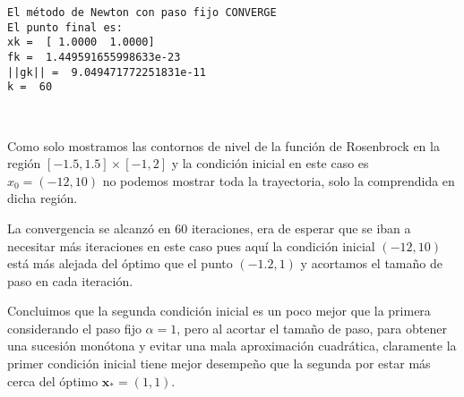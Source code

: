 \documentclass[11pt]{article}
\begin{document}
    \begin{Verbatim}[commandchars=\\\{\}]
El método de Newton con paso fijo CONVERGE
El punto final es:
xk =  [ 1.0000  1.0000]
fk =  1.449591655998633e-23
||gk|| =  9.049471772251831e-11
k =  60
    \end{Verbatim}

    \begin{center}
    \end{center}
    { \hspace*{\fill} \\}
    
    Como solo mostramos las contornos de nivel de la función de Rosenbrock
en la región \([-1.5,1.5]\times [-1,2]\) y la condición inicial en este
caso es \(x_0=(-12,10)\) no podemos mostrar toda la trayectoria, solo la
comprendida en dicha región.

La convergencia se alcanzó en 60 iteraciones, era de esperar que se iban
a necesitar más iteraciones en este caso pues aquí la condición inicial
\((-12,10)\) está más alejada del óptimo que el punto \((-1.2,1)\) y
acortamos el tamaño de paso en cada iteración.

Concluimos que la segunda condición inicial es un poco mejor que la
primera considerando el paso fijo \(\alpha=1\), pero al acortar el
tamaño de paso, para obtener una sucesión monótona y evitar una mala
aproximación cuadrática, claramente la primer condición inicial tiene
mejor desempeño que la segunda por estar más cerca del óptimo
\(\mathbf{x}_\ast=(1,1)\).


    
    
    
\end{document}
